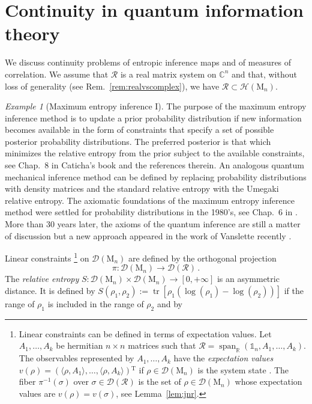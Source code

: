 \documentclass[a4paper,11pt,reqno]{amsart}
\newcommand{\C}{\mathbb{C}}
\newcommand{\R}{\mathbb{R}}
\newcommand{\M}{\mathrm{M}}
\newcommand{\cD}{\mathcal{D}}
\newcommand{\cH}{\mathcal{H}}
\newcommand{\cR}{\mathcal{R}}
\newcommand{\id}{\mathds{1}}
\newcommand{\tp}{{}^\mathrm{T}}
\DeclareMathOperator\spn{span}
\DeclareMathOperator\tr{tr}
\theoremstyle{definition}
\theoremstyle{remark}
\newtheorem{exa}[thm]{Example}
\numberwithin{equation}{section}
\begin{document}
\section{Continuity in quantum information theory}
\label{sec:quantum}
%
We discuss continuity problems of entropic inference maps and of measures 
of correlation. We assume that $\cR$ is a real matrix system on $\C^n$ and 
that, without loss of generality (see Rem.~\ref{rem:realvscomplex}), we 
have $\cR\subset\cH(\M_n)$. 
\par
%
\begin{exa}[Maximum entropy inference I]\label{exa:ME1}
The purpose of the maximum entropy inference method is to update a prior 
probability distribution if new information becomes available in the form of  
constraints that specify a set of possible posterior probability 
distributions. The preferred posterior is that which minimizes the relative 
entropy from the prior subject to the available constraints, see Chap.~8 in 
Caticha's book \cite{Caticha2022} and the references therein. An analogous 
quantum mechanical inference method can be defined by replacing probability 
distributions with density matrices and the standard relative entropy with 
the Umegaki relative entropy. The axiomatic foundations of the maximum 
entropy inference method were settled for probability distributions in the 
1980's, see Chap.~6 in \cite[pp.~157--160]{Caticha2022}. More than 30 years
later, the axioms of the quantum inference are still a matter of discussion
\cite{Ali-etal2012} but a new approach appeared in the work of Vanslette 
recently \cite{Vanslette2017}.
\par
%
Linear constraints%
%
\footnote{Linear constraints can be defined in terms of expectation values. 
Let $A_1,\dots,A_k$ be hermitian $n\times n$ matrices such that 
$\cR=\spn_\R(\id_n,A_1,\dots,A_k)$. The observables represented by 
$A_1,\dots,A_k$ have the \emph{expectation values}
$v(\rho)=(\langle\rho,A_1\rangle,\dots,\langle\rho,A_k\rangle)\tp$ if 
$\rho\in\cD(\M_n)$ is the system state \cite{BengtssonZyczkowski2017}. The 
fiber $\pi^{-1}(\sigma)$ over $\sigma\in\cD(\cR)$ is the set of 
$\rho\in\cD(\M_n)$ whose expectation values are $v(\rho)=v(\sigma)$, see
Lemma~\ref{lem:jnr}.}
%
on $\cD(\M_n)$ are defined by the orthogonal projection
\[\textstyle
\pi:\cD(\M_n)\to\cD(\cR)\,.
\]
The \emph{relative entropy} $S:\cD(\M_n)\times\cD(\M_n)\to[0,+\infty]$ 
is an asymmetric distance. It is defined by 
$S(\rho_1,\rho_2):=\tr[\rho_1(\log(\rho_1)-\log(\rho_2))]$ if the range 
of $\rho_1$ is included in the range of $\rho_2$ and by 

\end{exa}
\end{document}
